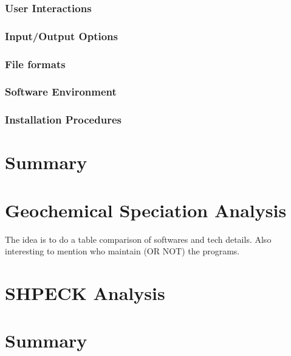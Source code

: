 \documentclass[ppgc,mestrado,english]{iiufrgs}
\begin{document}
\subsubsection{User Interactions}
\subsubsection{Input/Output Options}
\subsubsection{File formats}
\subsubsection{Software Environment}
\subsubsection{Installation Procedures}

\section{Summary}

\section{Geochemical Speciation Analysis}
The idea is to do a table comparison of softwares and tech details. Also interesting to mention who maintain (OR NOT) the programs.

\section{SHPECK Analysis}

\section{Summary}


\end{document}

